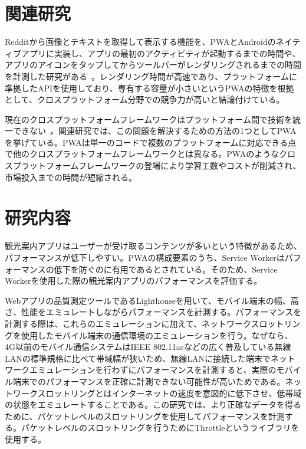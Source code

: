 \begin{multicols*}{2}
\section{関連研究}
Redditから画像とテキストを取得して表示する機能を、PWAとAndroidのネイティブアプリに実装し、アプリの最初のアクティビティが起動するまでの時間や、アプリのアイコンをタップしてからツールバーがレンダリングされるまでの時間を計測した研究がある~\cite{Andreas2018ProgressiveWebApps}。レンダリング時間が高速であり、プラットフォームに準拠したAPIを使用しており、専有する容量が小さいというPWAの特徴を根拠として、クロスプラットフォーム分野での競争力が高いと結論付けている。

現在のクロスプラットフォームフレームワークはプラットフォーム間で技術を統一できない~\cite{Majchrzak2018ProgressiveWebApps}。関連研究では、この問題を解決するための方法の1つとしてPWAを挙げている。PWAは単一のコードで複数のプラットフォームに対応できる点で他のクロスプラットフォームフレームワークとは異なる。PWAのようなクロスプラットフォームフレームワークの登場により学習工数やコストが削減され、市場投入までの時間が短縮される。
\section{研究内容}
観光案内アプリはユーザーが受け取るコンテンツが多いという特徴があるため、パフォーマンスが低下しやすい。PWAの構成要素のうち、Service Workerはパフォーマンスの低下を防ぐのに有用であるとされている。そのため、Service Workerを使用した際の観光案内アプリのパフォーマンスを評価する。

Webアプリの品質測定ツールであるLighthouseを用いて、モバイル端末の幅、高さ、性能をエミュレートしながらパフォーマンスを計測する。パフォーマンスを計測する際は、これらのエミュレーションに加えて、ネットワークスロットリングを使用したモバイル端末の通信環境のエミュレーションを行う。なぜなら、4G以前のモバイル通信システムはIEEE 802.11acなどの広く普及している無線LANの標準規格に比べて帯域幅が狭いため、無線LANに接続した端末でネットワークエミュレーションを行わずにパフォーマンスを計測すると、実際のモバイル端末でのパフォーマンスを正確に計測できない可能性が高いためである。ネットワークスロットリングとはインターネットの速度を意図的に低下させ、低帯域の状態をエミュレートすることである。この研究では、より正確なデータを得るために、パケットレベルのスロットリングを使用してパフォーマンスを計測する。パケットレベルのスロットリングを行うためにThrottleというライブラリを使用する。


\end{multicols*}
